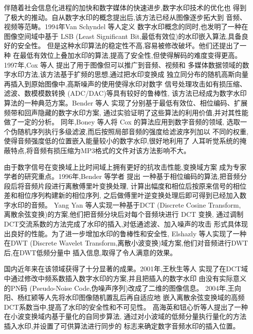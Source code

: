 \documentclass[a4paper,10pt]{article}
\begin{document}
伴随着社会信息化进程的加快和数字媒体的快速进步,数字水印技术的优化也
得到了极大的推动。自从数字水印的概念提出后,该方法已经从图像逐步拓大到
音频、视频等范畴。1994年Van Schyndel 等人\cite{schyndel1994}定义
数字水印概念的同时,也发明了一种在图像空间域中基于
LSB (Least Significant Bit,最低有效位)的水印嵌入算法,具备良好的安全性。
但是这种水印算法的稳定性不高,容易被修改破坏。他们还提出了一种
在最低有效位上叠加水印的算法,提高了安全性,但使得解码的难度变得更高。
1997年,Cox 等人\cite{cox1997} 提出了用于图像但可以推广到音频、视频和
多媒体数据领域的数字水印方法,该方法基于扩频的思想,通过把水印变换成
独立同分布的随机高斯向量再插入到原始图像中,高斯噪声的使用使得水印对数字
信号处理攻击如有损压缩、滤波、数模模数转换 (ADC/DAC)等具有较好的鲁棒性,
该方法已经成为数字水印算法的一种典范方案。Bender 等人\cite{bender1996}
实现了分别基于最低有效位、相位编码、扩展频带和回声隐藏的数字水印方案,
通过实验证明了这些算法的利用价值,并对其性能做了一定的分析。
同年,Boney 等人\cite{boney1996}将 Cox 的算法应用到数字音频的领域,
选取一个伪随机序列执行多级滤波,而后按照局部音频的强度给滤波序列加以
不同的权重,使得音频强度低的位置嵌入能量较小的数字水印,很好地利用了
人耳听觉系统的掩蔽特点,将音频有损压缩为MP3格式的文件对该方法影响不大。

由于数字信号在变换域上比时间域上拥有更好的抗攻击性能,变换域方案
成为专家学者的研究重点。1996年,Bender 等学者\cite{bender1996} 提出
一种基于相位编码的算法,把音频分段后将音频片段进行离散傅里叶变换处理,
计算出幅度和相位后按原来信号的相位差和相位序列构建新的相位序列,
之后做傅里叶逆变换处理后即可得到已经加入数字水印的音频。
Yang Yan 等人\cite{yang2009}实现一种基于DCT (Discrete Cosine Transform,
离散余弦变换)的方案,他们把音频分块后对每个音频块进行 DCT 变换,
通过调制DCT交流系数的方法完成了水印的插入,对低通滤波、加入噪声的攻击
形式具体现出良好的性能。为了进一步增加水印的鲁棒性和安全性,
Elshazly 等人\cite{elshazly2012}实现了一种在DWT (Discrete Wavelet
Transform,离散小波变换)域方案,他们对音频进行DWT后,在DWT低频分量中
插入信息,取得了令人满意的效果。

国内近年来在该领域获得了十分显著的成果。2001年,王秋生等人\cite{wang2001}
实现了在DCT域中通过修改中频系数插入数字水印的方案,并且把插入的数字水印
由没有实际意义的PN码 (Pseudo-Noise Code,伪噪声序列)改成了二维的图像信息。
2004年,王向阳、杨红颍等人\cite{wang2004}先将水印图像随机置乱后再自适应地
嵌入离散余弦变换域的高频DCT系数当中,提高了水印的安全性和不可见性。
高海英和钮心忻等人\cite{gao2005}提出了一种在小波变换域内基于量化的自同步算法,
通过对小波域的低频分量执行量化的方法插入水印,并设置了可供算法进行同步的
标志来确定数字音频水印的插入位置。



\end{document}
